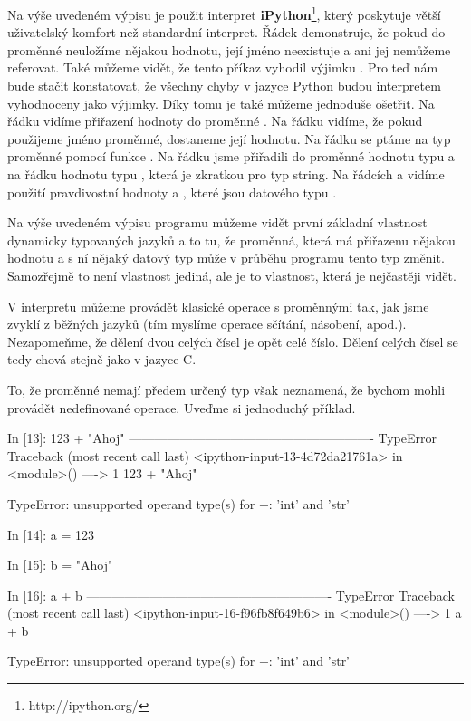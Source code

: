 Na výše uvedeném výpisu je použit interpret \textbf{iPython}\footnote{http://ipython.org/}, který poskytuje větší uživatelský komfort než standardní interpret.
Řádek  demonstruje, že pokud do proměnné  neuložíme nějakou hodnotu, její jméno neexistuje a ani jej nemůžeme referovat.
Také můžeme vidět, že tento příkaz vyhodil výjimku . Pro teď nám bude stačit konstatovat, že všechny chyby v jazyce
Python budou interpretem vyhodnoceny jako výjimky. Díky tomu je také můžeme jednoduše ošetřit. Na řádku  vidíme přiřazení hodnoty 
 do proměnné . Na řádku  vidíme, že pokud použijeme jméno proměnné, dostaneme její hodnotu. Na řádku  se
ptáme na typ proměnné pomocí funkce . Na řádku  jsme přiřadili do proměnné hodnotu typu  a na
řádku  hodnotu typu , která je zkratkou pro typ string. Na řádcích  a  vidíme použití pravdivostní hodnoty
 a , které jsou datového typu .

Na výše uvedeném výpisu programu můžeme vidět první základní vlastnost dynamicky typovaných jazyků a to tu, že proměnná, která má přiřazenu
nějakou hodnotu a s ní nějaký datový typ může v průběhu programu tento typ změnit.
Samozřejmě to není vlastnost jediná, ale je to vlastnost, která je nejčastěji vidět.

V interpretu můžeme provádět klasické operace s proměnnými tak, jak jsme zvyklí z běžných jazyků (tím myslíme operace sčítání,
násobení, apod.). Nezapomeňme, že dělení dvou celých čísel je opět celé číslo. Dělení celých čísel se tedy chová stejně jako v jazyce C.

To, že proměnné nemají předem určený typ však neznamená, že bychom mohli provádět nedefinované operace. Uveďme si jednoduchý příklad.

\begin{python}
In [13]: 123 + "Ahoj"
----------------------------------------------------------
TypeError                Traceback (most recent call last)
<ipython-input-13-4d72da21761a> in <module>()
----> 1 123 + "Ahoj"

TypeError: unsupported operand type(s) for +: 'int' and 'str'

In [14]: a = 123

In [15]: b = "Ahoj"

In [16]: a + b
----------------------------------------------------------
TypeError                Traceback (most recent call last)
<ipython-input-16-f96fb8f649b6> in <module>()
----> 1 a + b

TypeError: unsupported operand type(s) for +: 'int' and 'str'
\end{python}

